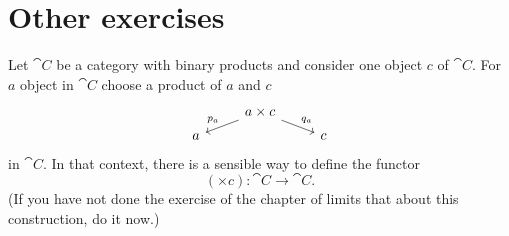 
\section{Other exercises}

\begin{remark}
Let \(\cat C\) be a category with binary products and consider one object \(c\) of \(\cat C\). For \(a\) object in \(\cat C\) choose a product of \(a\) and \(c\)
\[\begin{tikzcd}[row sep=tiny]
& a \times c \ar["{p_a}", dl, swap] \ar["{q_a}", dr] & \\
a & & c
\end{tikzcd}\]
in \(\cat C\). In that context, there is a sensible way to define the functor
\[(\times c) : \cat C \to \cat C .\]
(If you have not done the exercise of the chapter of limits that about this construction, do it now.)
\end{remark}

